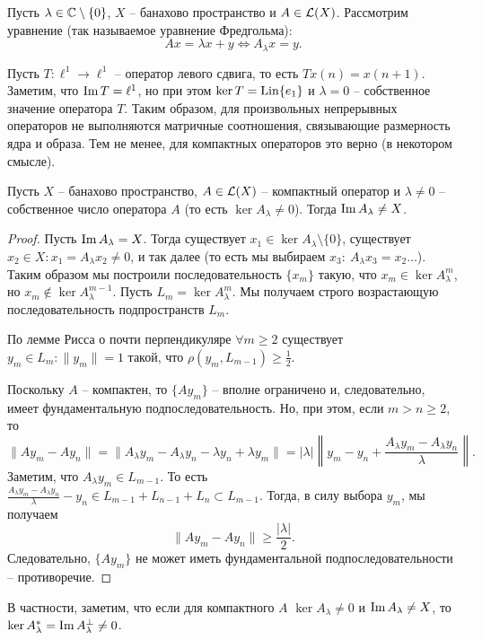 \begin{example}
     Пусть $\lambda \in \mathbb{C} \setminus \{0\}$, $X$ -- банахово пространство и $A \in \mathcal{L}(X)$.
     Рассмотрим уравнение (так называемое уравнение Фредгольма):
     \[
        Ax = \lambda x + y \Longleftrightarrow A_\lambda x = y.
     \]
\end{example}
\begin{example}
    Пусть $T\colon \ell^1 \to \ell^1$ -- оператор левого сдвига, то есть $Tx(n) = x(n + 1)$.
    Заметим, что $\operatorname{Im} T = \ell^1$, но при этом $\ker T = \operatorname{Lin}\{e_1\}$ и $\lambda = 0$ -- собственное значение оператора $T$. Таким образом, для произвольных непрерывных операторов не выполняются матричные соотношения, связывающие размерность ядра и образа. Тем не менее, для компактных операторов это верно (в некотором смысле).
\end{example}
\begin{theorem}
    Пусть $X$ -- банахово пространство, $A \in \mathcal{L}(X)$ -- компактный оператор и $\lambda \neq 0$ -- собственное число оператора $A$ (то есть $\ker A_\lambda \neq 0$). Тогда $\operatorname{Im} A_\lambda \neq X$.
\end{theorem}
\begin{proof}
    Пусть $\operatorname{Im} A_\lambda = X$.
    Тогда существует $x_1 \in \ker A_\lambda \setminus \{0\}$, существует $x_2 \in X\colon x_1 = A_\lambda x_2 \neq 0$, и так далее (то есть мы выбираем $x_3\colon \ A_\lambda x_3 = x_2\ldots$).
    Таким образом мы построили последовательность $\{x_m\}$ такую, что $x_m \in \ker A_\lambda^m$, но $x_m \notin \ker A_\lambda^{m - 1}$.
    Пусть $L_m = \ker A_\lambda^m$. Мы получаем строго возрастающую последовательность подпространств $L_m$.

    По лемме Рисса о почти перпендикуляре $\forall m \geq 2$ существует $y_m \in L_m\colon \|y_m\| = 1$ такой, что $\rho(y_m, L_{m - 1}) \geq \frac{1}{2}$.

    Поскольку $A$ -- компактен, то $\{Ay_m\}$ -- вполне ограничено и, следовательно, имеет фундаментальную подпоследовательность.
    Но, при этом, если $m > n \geq 2$, то
    \[
        \|Ay_m - Ay_n\| = \|A_\lambda y_m - A_\lambda y_n - \lambda y_n + \lambda y_m\| = |\lambda| \left\|y_m - y_n + \frac{A_\lambda y_m - A_\lambda y_n}{\lambda}\right\|.
    \]
    Заметим, что $A_\lambda y_m \in L_{m - 1}$.
    То есть $\frac{A_\lambda y_m - A_\lambda y_n}{\lambda} - y_n \in L_{m - 1} + L_{n - 1} + L_n \subset L_{m - 1}$.
    Тогда, в силу выбора $y_m$, мы получаем
    \[
        \|Ay_m - Ay_n\| \geq \frac{|\lambda|}{2}.
    \]
    Следовательно, $\{Ay_m\}$ не может иметь фундаментальной подпоследовательности -- противоречие.
\end{proof}
\begin{note}
    В частности, заметим, что если для компактного $A$ $\ker A_\lambda \neq 0$ и $\operatorname{Im} A_\lambda\neq X$, то $\ker A_\lambda^* = \operatorname{Im} A_\lambda^\perp \neq 0$.
\end{note}
